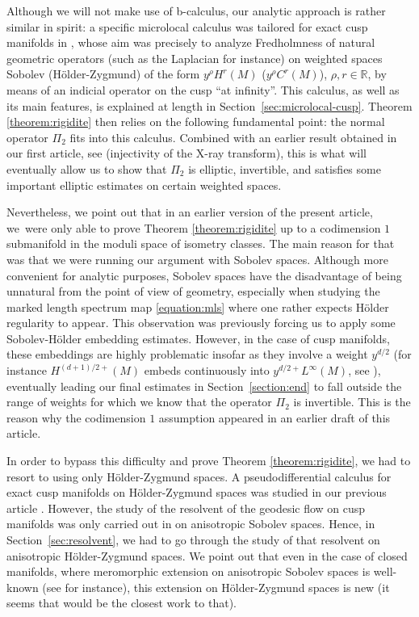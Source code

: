 \documentclass[JEP,XML,SOM,Unicode,NoFloatCountersInSection]{cedram}
\newcommand{\R}{\mathbb{R}}
\theoremstyle{plain}
\theoremstyle{definition}
\begin{document}
Although we will not make use of b-calculus, our analytic approach is rather similar in spirit: a specific microlocal calculus was tailored for exact cusp manifolds in \cite{Bonthonneau-16,Bonthonneau-Weich-17,Bonthonneau-Lefeuvre-19-1}, whose aim was precisely to analyze Fredholmness of natural geometric operators (such as the Laplacian for instance) on weighted spaces Sobolev (\resp Hölder-Zygmund) of the form $y^\rho H^r(M)$ (\resp $y^\rho C^r(M)$), $\rho,r \in \R$, by means of an indicial operator on the cusp ``at infinity''. This calculus, as well as its main features, is explained at length in Section~\ref{sec:microlocal-cusp}. Theorem \ref{theorem:rigidite} then relies on the following fundamental point: the normal operator $\Pi_2$ fits into this calculus. Combined with an earlier result obtained in our first article, see \cite[Th.\,1]{Bonthonneau-Lefeuvre-19-1} (injectivity of the X-ray transform), this is what will eventually allow us to show that $\Pi_2$ is elliptic, invertible, and satisfies some important elliptic estimates on certain weighted spaces.

Nevertheless, we point out that in an earlier version of the present article, we~were only able to prove Theorem \ref{theorem:rigidite} up to a codimension $1$ submanifold in the moduli space of isometry classes. The main reason for that was that we were running our argu\-ment with Sobolev spaces. Although more convenient for analytic purposes, Sobolev spaces have the disadvantage of being unnatural from the point of view of geometry, especially when studying the marked length spectrum map \eqref{equation:mls} where one rather expects Hölder regularity to appear. This observation was previously \hbox{forcing} us to apply some Sobolev-Hölder embedding estimates. However, in the case of cusp manifolds, these embeddings are highly problematic insofar as they involve a weight $y^{d/2}$ (for instance $H^{(d+1)/2+}(M)$ embeds continuously into $y^{d/2+}L^\infty(M)$, see \cite[Lem.\,2.1]{Bonthonneau-Lefeuvre-19-1}), eventually leading our final estimates in Section~\ref{section:end} to fall outside the range of weights for which we know that the operator $\Pi_2$ is invertible. This is the reason why the codimension $1$ assumption appeared in an earlier draft of this article.

In order to bypass this difficulty and prove Theorem \ref{theorem:rigidite}, we had to resort to using only Hölder-Zygmund spaces. A pseudodifferential calculus for exact cusp manifolds on Hölder-Zygmund spaces was studied in our previous article \cite{Bonthonneau-Lefeuvre-19-1}. However, the study of the resolvent of the geodesic flow on cusp manifolds was only carried out in \cite{Bonthonneau-Weich-17} on anisotropic Sobolev spaces. Hence, in Section~\ref{sec:resolvent}, we had to go through the study of that resolvent on anisotropic Hölder-Zygmund spaces. We point out that even in the case of closed manifolds, where meromorphic extension on anisotropic Sobolev spaces is well-known (see \cite{Faure-Sjostrand-11, Dyatlov-Zworski-16} for instance), this extension on Hölder-Zygmund spaces is new (it seems that \cite{Adam-Baladi-21} would be the closest work to that).
\end{document}

